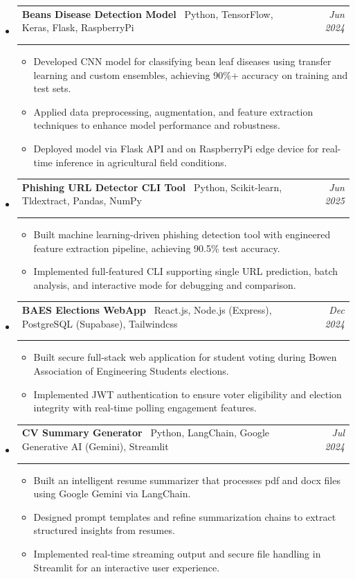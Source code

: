 \documentclass[11pt,a4paper]{article}
\makeatletter
\newcommand{\resumeProjectHeading}[4]{
  \vspace{2pt}
  \item[]
    \begin{tabular*}{\textwidth}[t]{@{\hspace{0pt}}p{0.82\textwidth}@{\extracolsep{\fill}}r}
      \textbf{#1} {\small\textbar\ #2} & \textit{#3} \\
      \if\relax\detokenize{#4}\relax\else
        \multicolumn{2}{l}{\footnotesize\color{gray!70}\faGithub\ \href{#4}{#4}} \\
      \fi
    \end{tabular*}
  \vspace{-8pt}
}
\makeatother
\begin{document}
\begin{itemize}[leftmargin=0pt, label={}]
\resumeProjectHeading
  {Beans Disease Detection Model}{Python, TensorFlow, Keras, Flask, RaspberryPi}{Jun 2024}{https://github.com/DejusDevspace/bean-disease-classification}
  \begin{itemize}[leftmargin=15pt, label=\textbullet]
    \item Developed CNN model for classifying bean leaf diseases using transfer learning and custom ensembles, achieving 90\%+ accuracy on training and test sets.
    \item Applied data preprocessing, augmentation, and feature extraction techniques to enhance model performance and robustness.
    \item Deployed model via Flask API and on RaspberryPi edge device for real-time inference in agricultural field conditions.
  \end{itemize}

\resumeProjectHeading
  {Phishing URL Detector CLI Tool}{Python, Scikit-learn, Tldextract, Pandas, NumPy}{Jun 2025}{https://github.com/DejusDevspace/phishing-detector-ml-cli-toolkit}
  \begin{itemize}[leftmargin=15pt, label=\textbullet]
    \item Built machine learning-driven phishing detection tool with engineered feature extraction pipeline, achieving 90.5\% test accuracy.
    \item Implemented full-featured CLI supporting single URL prediction, batch analysis, and interactive mode for debugging and comparison.
  \end{itemize}

\resumeProjectHeading
  {BAES Elections WebApp}{React.js, Node.js (Express), PostgreSQL (Supabase), Tailwindcss}{Dec 2024}{https://github.com/DejusDevspace/baes-election-website}
  \begin{itemize}[leftmargin=15pt, label=\textbullet]
    \item Built secure full-stack web application for student voting during Bowen Association of Engineering Students elections.
    \item Implemented JWT authentication to ensure voter eligibility and election integrity with real-time polling engagement features.
  \end{itemize}

\resumeProjectHeading
  {CV Summary Generator}{Python, LangChain, Google Generative AI (Gemini), Streamlit}{Jul 2024}{https://github.com/DejusDevspace/CV-upload-CV-summarize-RAG-app}
  \begin{itemize}[leftmargin=15pt, label=\textbullet]
    \item Built an intelligent resume summarizer that processes pdf and docx files using Google Gemini via LangChain.
    \item Designed prompt templates and refine summarization chains to extract structured insights from resumes.
    \item Implemented real-time streaming output and secure file handling in Streamlit for an interactive user experience.
  \end{itemize}

\end{itemize}
\end{document}
